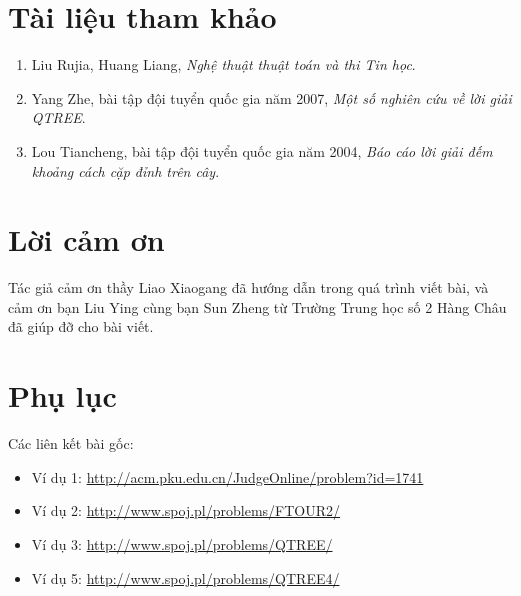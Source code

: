 \documentclass[11pt]{article}
\begin{document}
\section*{Tài liệu tham khảo}
\begin{enumerate}
  \item Liu Rujia, Huang Liang, \textit{Nghệ thuật thuật toán và thi Tin học}.
  \item Yang Zhe, bài tập đội tuyển quốc gia năm 2007, \textit{Một số nghiên
  cứu về lời giải QTREE}.
  \item Lou Tiancheng, bài tập đội tuyển quốc gia năm 2004, \textit{Báo cáo
  lời giải đếm khoảng cách cặp đỉnh trên cây}.
\end{enumerate}

\section*{Lời cảm ơn}

Tác giả cảm ơn thầy Liao Xiaogang đã hướng dẫn trong quá trình viết bài, và
cảm ơn bạn Liu Ying cùng bạn Sun Zheng từ Trường Trung học số 2 Hàng Châu đã
giúp đỡ cho bài viết.

\section*{Phụ lục}

Các liên kết bài gốc:
\begin{itemize}
  \item Ví dụ 1: \url{http://acm.pku.edu.cn/JudgeOnline/problem?id=1741}
  \item Ví dụ 2: \url{http://www.spoj.pl/problems/FTOUR2/}
  \item Ví dụ 3: \url{http://www.spoj.pl/problems/QTREE/}
  \item Ví dụ 5: \url{http://www.spoj.pl/problems/QTREE4/}
\end{itemize}
\end{document}
